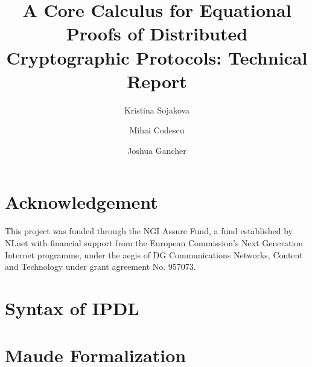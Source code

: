 \documentclass[11pt,hidelinks]{article}
\newcommand{\ipdl}{\textsf{IPDL} }
\begin{document}
\title{A Core Calculus for Equational Proofs of Distributed Cryptographic Protocols: Technical Report}
\author{Kristina Sojakova \and Mihai Codescu \and Joshua Gancher}

\maketitle

\section*{\small Acknowledgement}
This project was funded through the NGI Assure Fund, a fund established by NLnet with financial support from the European Commission's Next Generation Internet programme, under the aegis of DG Communications Networks, Content and Technology under grant agreement No. 957073.

\section{Syntax of \ipdl}


%

%



\section{Maude Formalization}


 


%
\end{document}
